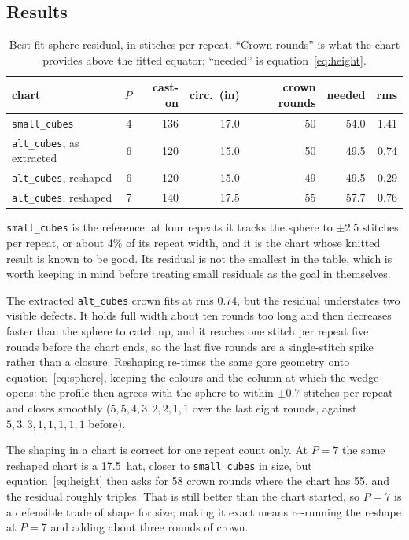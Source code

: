 \documentclass[11pt]{article}
\begin{document}
\subsection{Results}

\begin{table}[h]
\centering
\begin{tabular}{lrrrrrr}
\toprule
chart & $P$ & cast-on & circ.\ (in) & crown rounds & needed & rms \\
\midrule
\texttt{small\_cubes}            & 4 & 136 & 17.0 & 50 & 54.0 & 1.41 \\
\texttt{alt\_cubes}, as extracted & 6 & 120 & 15.0 & 50 & 49.5 & 0.74 \\
\texttt{alt\_cubes}, reshaped    & 6 & 120 & 15.0 & 49 & 49.5 & 0.29 \\
\texttt{alt\_cubes}, reshaped    & 7 & 140 & 17.5 & 55 & 57.7 & 0.76 \\
\bottomrule
\end{tabular}
\caption{Best-fit sphere residual, in stitches per repeat. ``Crown rounds'' is
what the chart provides above the fitted equator; ``needed'' is
equation~\eqref{eq:height}.}
\label{tab:shape}
\end{table}

\texttt{small\_cubes} is the reference: at four repeats it tracks the sphere to
$\pm 2.5$ stitches per repeat, or about 4\% of its repeat width, and it is the
chart whose knitted result is known to be good. Its residual is not the
smallest in the table, which is worth keeping in mind before treating small
residuals as the goal in themselves.

The extracted \texttt{alt\_cubes} crown fits at rms 0.74, but the residual
understates two visible defects. It holds full width about ten rounds too long
and then decreases faster than the sphere to catch up, and it reaches one
stitch per repeat five rounds before the chart ends, so the last five rounds
are a single-stitch spike rather than a closure. Reshaping re-times the same
gore geometry onto equation~\eqref{eq:sphere}, keeping the colours and the
column at which the wedge opens: the profile then agrees with the sphere to
within $\pm 0.7$ stitches per repeat and closes smoothly ($5,5,4,3,2,2,1,1$
over the last eight rounds, against $5,3,3,1,1,1,1,1$ before).

The shaping in a chart is correct for one repeat count only. At $P=7$ the same
reshaped chart is a 17.5\, hat, closer to \texttt{small\_cubes} in size,
but equation~\eqref{eq:height} then asks for 58 crown rounds where the chart has
55, and the residual roughly triples. That is still better than the chart
started, so $P=7$ is a defensible trade of shape for size; making it exact means
re-running the reshape at $P=7$ and adding about three rounds of crown.
\end{document}
